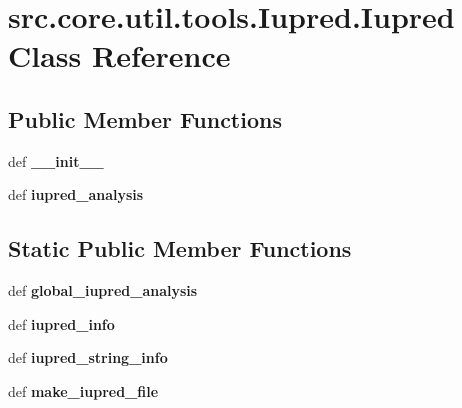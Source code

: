 \hypertarget{classsrc_1_1core_1_1util_1_1tools_1_1Iupred_1_1Iupred}{\section{src.\-core.\-util.\-tools.\-Iupred.\-Iupred Class Reference}
\label{classsrc_1_1core_1_1util_1_1tools_1_1Iupred_1_1Iupred}
}
\subsection*{Public Member Functions}
\begin{DoxyCompactItemize}
\item 
\hypertarget{classsrc_1_1core_1_1util_1_1tools_1_1Iupred_1_1Iupred_aa97a1c7fdb4d71aabf21b991b2bb776a}{def {\bfseries \-\_\-\-\_\-init\-\_\-\-\_\-}}\label{classsrc_1_1core_1_1util_1_1tools_1_1Iupred_1_1Iupred_aa97a1c7fdb4d71aabf21b991b2bb776a}

\item 
\hypertarget{classsrc_1_1core_1_1util_1_1tools_1_1Iupred_1_1Iupred_a926970f11daa2e22bac028681d406aa7}{def {\bfseries iupred\-\_\-analysis}}\label{classsrc_1_1core_1_1util_1_1tools_1_1Iupred_1_1Iupred_a926970f11daa2e22bac028681d406aa7}

\end{DoxyCompactItemize}
\subsection*{Static Public Member Functions}
\begin{DoxyCompactItemize}
\item 
\hypertarget{classsrc_1_1core_1_1util_1_1tools_1_1Iupred_1_1Iupred_ab44cc4f1500c7a512036ff757aa33c41}{def {\bfseries global\-\_\-iupred\-\_\-analysis}}\label{classsrc_1_1core_1_1util_1_1tools_1_1Iupred_1_1Iupred_ab44cc4f1500c7a512036ff757aa33c41}

\item 
\hypertarget{classsrc_1_1core_1_1util_1_1tools_1_1Iupred_1_1Iupred_a5648fd4ecb62f1c0be233d2db41fac6d}{def {\bfseries iupred\-\_\-info}}\label{classsrc_1_1core_1_1util_1_1tools_1_1Iupred_1_1Iupred_a5648fd4ecb62f1c0be233d2db41fac6d}

\item 
\hypertarget{classsrc_1_1core_1_1util_1_1tools_1_1Iupred_1_1Iupred_a3b51420992f771cdc8a42d4c75fd61af}{def {\bfseries iupred\-\_\-string\-\_\-info}}\label{classsrc_1_1core_1_1util_1_1tools_1_1Iupred_1_1Iupred_a3b51420992f771cdc8a42d4c75fd61af}

\item 
\hypertarget{classsrc_1_1core_1_1util_1_1tools_1_1Iupred_1_1Iupred_ae375b5b15f3ad45d5de0c91de614a5c8}{def {\bfseries make\-\_\-iupred\-\_\-file}}\label{classsrc_1_1core_1_1util_1_1tools_1_1Iupred_1_1Iupred_ae375b5b15f3ad45d5de0c91de614a5c8}

\end{DoxyCompactItemize}
